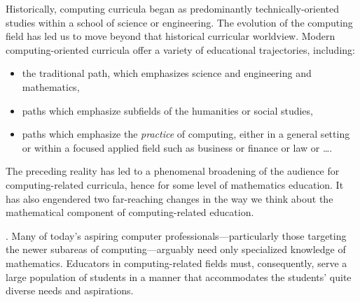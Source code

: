 Historically, computing curricula began as predominantly technically-oriented studies within a school of science or engineering.  The evolution of the computing field has led us to move beyond that historical curricular worldview.  Modern computing-oriented curricula offer a variety of educational trajectories, including:
\begin{itemize}
\item
the traditional path, which emphasizes science and engineering and mathematics,
\medskip\item
paths which emphasize subfields of the humanities or social studies,
\medskip\item
paths which emphasize the {\em practice} of computing, either in a general setting or within a focused applied field such as business or finance or law or \ldots.
\end{itemize}
The preceding reality has led to a phenomenal broadening of the audience for computing-related curricula, hence for some level of mathematics education.  It has also engendered two far-reaching changes in the way we think about the mathematical component of computing-related education.

\medskip

.
Many of today's aspiring computer professionals---particularly those targeting the newer subareas of computing---arguably need only specialized knowledge of mathematics.  Educators in computing-related fields must, consequently, serve a large population of students in a manner that accommodates the students' quite diverse needs and aspirations.

\medskip

